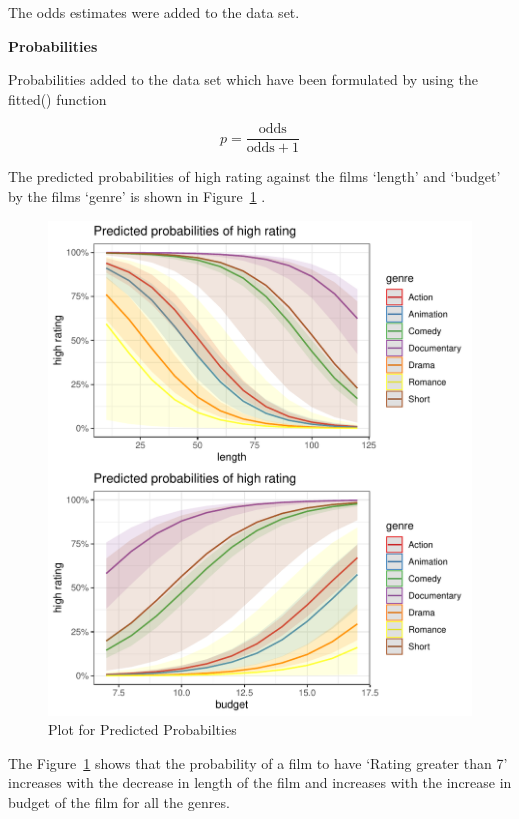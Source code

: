 \documentclass[
  letterpaper,
  DIV=11,
  numbers=noendperiod]{scrartcl}
\begin{document}
\clearpage

The odds estimates were added to the data set.

\textbf{Probabilities}

Probabilities added to the data set which have been formulated by using
the fitted() function

\[p = \frac{\text{odds}}{\text{odds} + 1}\]

The predicted probabilities of high rating against the films `length'
and `budget' by the films `genre' is shown in
Figure~\ref{fig-probabilities-plot} .

\begin{figure}

{\centering \includegraphics{Group_06_Analysis_files/figure-pdf/fig-probabilities-plot-1.pdf}

}

\caption{\label{fig-probabilities-plot}Plot for Predicted Probabilties}

\end{figure}

\clearpage

The Figure~\ref{fig-probabilities-plot} shows that the probability of a
film to have `Rating greater than 7' increases with the decrease in
length of the film and increases with the increase in budget of the film
for all the genres.
\end{document}
